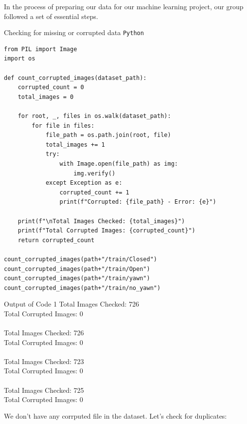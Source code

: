 \documentclass{modeleRapport}
\begin{document}
In the process of preparing our data for our machine learning project, our group followed a set of essential steps.

\begin{codebox}{Checking for missing or corrupted data \texttt{Python}}
\begin{verbatim}
from PIL import Image
import os

def count_corrupted_images(dataset_path):
    corrupted_count = 0
    total_images = 0

    for root, _, files in os.walk(dataset_path):
        for file in files:
            file_path = os.path.join(root, file)
            total_images += 1
            try:
                with Image.open(file_path) as img:
                    img.verify()
            except Exception as e:
                corrupted_count += 1
                print(f"Corrupted: {file_path} - Error: {e}")

    print(f"\nTotal Images Checked: {total_images}")
    print(f"Total Corrupted Images: {corrupted_count}")
    return corrupted_count

count_corrupted_images(path+"/train/Closed")
count_corrupted_images(path+"/train/Open")
count_corrupted_images(path+"/train/yawn")
count_corrupted_images(path+"/train/no_yawn")
\end{verbatim}
\end{codebox}

\begin{codebox}[OutputA]{ Output of Code 1}
Total Images Checked: 726\\
Total Corrupted Images: 0\\
\\
Total Images Checked: 726\\
Total Corrupted Images: 0\\
\\
Total Images Checked: 723\\
Total Corrupted Images: 0\\
\\
Total Images Checked: 725\\
Total Corrupted Images: 0\\
\end{codebox}

We don't have any corrputed file in the dataset. Let's check for duplicates:
\end{document}
